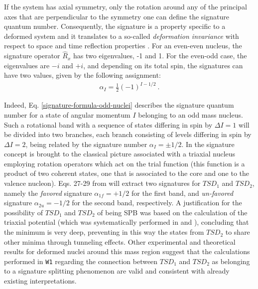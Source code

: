 \documentclass[11pt]{article}
\begin{document}
If the system has axial symmetry, only the rotation around any of the principal axes that are perpendicular to the symmetry one can define the signature quantum number. Consequently, the signature is a property specific to a deformed system and it translates to a so-called \emph{deformation invariance} with respect to space and time reflection properties \cite{bohr1998nuclear}. For an even-even nucleus, the signature operator $\hat{R}_x$ has two eigenvalues, -1 and 1. For the even-odd case, the eigenvalues are $-i$ and $+i$, and depending on its total spin, the signatures can have two values, given by the following assignment:
\begin{align}
    \alpha_I=\frac{1}{2}\left(-1\right)^{I-1/2}\ .
    \label{signature-formula-odd-nuclei}
\end{align}

Indeed, Eq. \ref{signature-formula-odd-nuclei} describes the signature quantum number for a state of angular momentum $I$ belonging to an odd mass nucleus. Such a rotational band with a sequence of states differing in spin by $\Delta I=1$ will be divided into two branches, each branch consisting of levels differing in spin by $\Delta I=2$, being related by the signature number $\alpha_I=\pm 1/2$. In \cite{raduta2020approach} the signature concept is brought to the classical picture associated with a triaxial nucleus employing rotation operators which act on the trial function (this function is a product of two coherent states, one that is associated to the core and one to the valence nucleon). Eqs. 27-29 from \cite{raduta2020approach} will extract two signatures for $TSD_1$ and $TSD_2$, namely the \emph{favored} signature $\alpha_{1f}=+1/2$ for the first band, and \emph{un-favored} signature $\alpha_{2u}=-1/2$ for the second band, respectively. A justification for the possibility of $TSD_1$ and $TSD_2$ of being SPB was based on the calculation of the triaxial potential (which was systematically performed in \cite{raduta2017semiclassical} and \cite{raduta2018wobbling}), concluding that the minimum is very deep, preventing in this way the states from $TSD_2$ to share other minima through tunneling effects. Other experimental and theoretical results \cite{sun1994varied,khalaf11properties,uma2015deltai,mittal2016signature} for deformed nuclei around this mass region suggest that the calculations performed in \texttt{W1} regarding the connection between $TSD_1$ and $TSD_2$ as belonging to a signature splitting phenomenon are valid and consistent with already existing interpretations.
\end{document}
